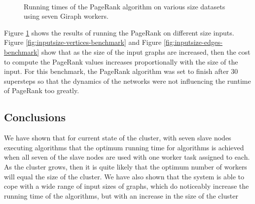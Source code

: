\begin{figure}[htbp]
  \centering {}
  ~ 
  ~
  \caption{Running times of the PageRank algorithm on various size datasets using seven Giraph workers.}
  \label{fig:inputsize-benchmark}
\end{figure}

Figure \ref{fig:inputsize-benchmark} shows the results of running the PageRank on different size inputs. Figure \ref{fig:inputsize-vertices-benchmark} and Figure \ref{fig:inputsize-edges-benchmark} show that as the size of the input graphs are increased, then the cost to compute the PageRank values increases proportionally with the size of the input. For this benchmark, the PageRank algorithm was set to finish after 30 supersteps so that the dynamics of the networks were not influencing the runtime of PageRank too greatly.

\subsection{Conclusions}
We have shown that for current state of the cluster, with seven slave nodes
executing algorithms that the optimum running time for algorithms is achieved
when all seven of the slave nodes are used with one worker task assigned to
each. As the cluster grows, then it is quite likely that the optimum number of
workers will equal the size of the cluster. We have also shown that the system
is able to cope with a wide range of input sizes of graphs, which do noticeably
increase the running time of the algorithms, but with an increase in the size
of the cluster
